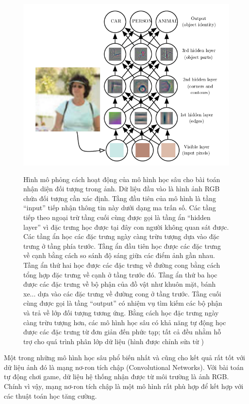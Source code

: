 	\begin{figure}
		\centering
		\includegraphics[width=\textwidth]{deep_learning_example}
		\label{fig_dl_Example}
		\caption[Hình mô phỏng cách hoạt động của mô hình học sâu]{Hình mô phỏng cách hoạt động của mô hình học sâu cho bài toán nhận diện đối tượng trong ảnh.
		Dữ liệu đầu vào là hình ảnh RGB chứa đối tượng cần xác định. Tầng đầu tiên của mô hình là tầng ``input'' tiếp nhận thông tin này dưới dạng ma trấn số. 
		Các tầng tiếp theo ngoại trừ tầng cuối cùng được gọi là tầng ẩn ``hidden layer'' vì đặc trưng học được tại đây con người không quan sát được. 
		Các tầng ẩn học các đặc trưng ngày càng trừu tượng dựa vào đặc trưng ở tầng phía trước. 
		Tầng ẩn đầu tiên học được các đặc trưng về cạnh bằng cách so sánh độ sáng giữa các điểm ảnh gần nhau. 
		Tầng ẩn thứ hai học được các đặc trưng về đường cong bằng cách tổng hợp đặc trưng về cạnh ở tầng trước đó. 
		Tầng ẩn thứ ba học được các đặc trưng về bộ phận của đồ vật như khuôn mặt, bánh xe... dựa vào các đặc trưng về đường cong ở tầng trước. 
		Tầng cuối cùng được gọi là tầng ``output'' có nhiệm vụ tìm kiếm các bộ phận và trả về lớp đối tượng tương ứng. 
		Bằng cách học đặc trưng ngày càng trừu tượng hơn, các mô hình học sâu có khả năng tự động học được các đặc trưng từ đơn giản đến phức tạp; tất cả đều nhằm hỗ trợ cho quá trình phân lớp dữ liệu (hình được chỉnh sửa từ \cite{Goodfellow-et-al-2016-Book})}
	\end{figure}
	
	Một trong những mô hình học sâu phổ biến nhất và cũng cho kết quả rất tốt với dữ liệu ảnh đó là mạng nơ-ron tích chập (Convolutional Networks).
	Với bài toán tự động chơi game, dữ liệu hệ thống nhận được từ môi trường là ảnh RGB.
	Chính vì vậy, mạng nơ-ron tích chập là một mô hình rất phù hợp để kết hợp với các thuật toán học tăng cường.
	
